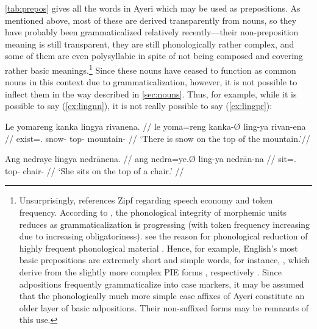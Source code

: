 
\autoref{tab:prepos} gives all the words in Ayeri which may be used as
prepositions. As mentioned above, most of these are derived transparently from
nouns, so they have probably been grammaticalized relatively recently---their
non-preposition meaning is still transparent, they are still phonologically
rather complex, and some of them are even polysyllabic in spite of not being
composed and covering rather basic meanings.\footnote{Unsurprisingly,
\citet[129]{hagege2010} references Zipf regarding speech economy and token
frequency. According to \citet[134--141]{lehmann2015}, the phonological
integrity of morphemic units reduces as grammaticalization is progressing (with
token frequency increasing due to increasing obligatoriness).
\citet{bybeehopper2001b} see the reason for phonological reduction of highly
frequent phonological material . Hence, for example, English's most basic prepositions
are extremely short and simple words, for instance, , which
derive from the slightly more complex PIE forms ,
respectively \citep[1, 39, 269]{kroonen2013}. Since adpositions frequently
grammaticalize into case markers, it may be assumed that the phonologically
much more simple case affixes of Ayeri constitute an older layer of basic
adpositions. Their non-suffixed forms may be remnants of this use.} Since these
nouns have ceased to function as common nouns in this context due to
grammaticalization, however, it is not possible to inflect them in the way
described in \autoref{sec:nouns}. Thus, for example, while it is possible to
say (\ref{ex:lingnn}), it is not really possible to say (\ref{ex:lingpr}):

\pex
\a\label{ex:lingnn}\begingl
	\gla Le yomareng kanka lingya rivanena. //
	\glb le yoma=reng kanka-Ø ling-ya rivan-ena //
	\glc \PatTI{} exist=\TsgI{}.\Aarg{} snow-\Top{} top-\Loc{}
		mountain-\Gen{} //
	\glft `There is snow on the top of the mountain.'\footnotemark //
\endgl

\a\label{ex:lingpr}\ljudge* \begingl
	\gla Ang nedraye lingya nedrānena. //
	\glb ang nedra=ye.Ø ling-ya nedrān-na //
	\glc \AgtT{} sit=\TsgF{}.\Top{} top-\Loc{} chair-\Gen{} //
	\glft `\ques{}She sits on the top of a chair.' //
\endgl

